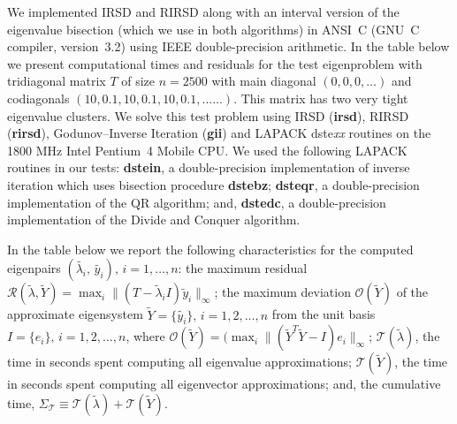 \documentclass{report}
\begin{document}
We implemented IRSD and RIRSD along with an interval version of
the eigenvalue bisection (which we use in both algorithms)
in ANSI~C (GNU~C compiler, version~3.2) using IEEE
double-precision arithmetic. In the table below we present
computational times and residuals for the test eigenproblem with
tridiagonal matrix $T$ of size $n=2500$ with main diagonal $(0,
0, 0, \ldots)$ and codiagonals $(10, 0.1, 10, 0.1, 10, 0.1,
...\ldots)$. This matrix has two very tight eigenvalue clusters.
We solve this test problem using IRSD (\textbf{irsd}), RIRSD (\textbf{rirsd}),
Godunov--Inverse Iteration (\textbf{gii}) and
LAPACK dste\emph{xx} routines on the 1800 MHz
Intel\textregistered{} Pentium~4 Mobile\textregistered{} CPU\@.
We used the following LAPACK routines in our tests:
\textbf{dstein}, a double-precision implementation of inverse iteration which
uses bisection procedure \textbf{dstebz};
\textbf{dsteqr}, a double-precision implementation of the QR algorithm; and,
\textbf{dstedc}, a double-precision implementation of the Divide and Conquer algorithm.

In the table below we report the following characteristics for
the computed eigenpairs
$(\tilde{\lambda_i},\,\tilde{y_i}),\,i=1,\ldots, n$: the maximum
residual $\mathcal{R}(\tilde{\lambda}, \tilde{Y}) = \max_i \| (T
- \tilde{\lambda}_i I) \tilde{y}_i \|_\infty$; the maximum
deviation $\mathcal{O}(\tilde{Y})$ of the approximate eigensystem
$\tilde{Y} = \{\tilde{y_i}\},\, i = 1, 2, \ldots, n$ from the unit basis
$I = \{e_i\},\, i = 1, 2,\ldots, n$, where
$\mathcal{O}(\tilde{Y})=(\max_i \|(\tilde{Y}^T \tilde{Y} - I)
e_i\|_\infty$; $\mathcal{T}( \tilde{\lambda})$, the time in seconds spent
computing all eigenvalue
approximations; $\mathcal{T}( \tilde{Y})$, the time in seconds
spent computing all eigenvector approximations; and, the
cumulative time, $\Sigma_{\mathcal{T}} \equiv
\mathcal{T}(\tilde{\lambda}) + \mathcal{T}( \tilde{Y})$.

\begin{table}[hbtp]
\centering
{}
\label{tbl:TestNew}
\end{table}
\end{document}
